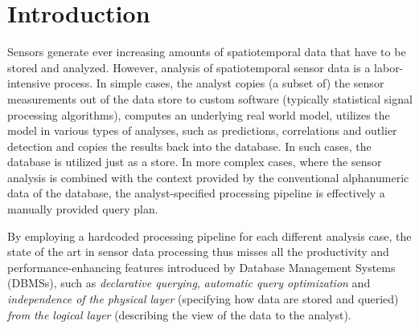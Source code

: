 \section{Introduction}
\label{sec:introduction}

Sensors generate ever increasing amounts of spatiotemporal data that have to be stored and analyzed. However, analysis of spatiotemporal sensor data is a labor-intensive process. In simple cases, the analyst copies (a subset of) the sensor measurements out of the data store to custom software (typically statistical signal processing algorithms),  computes an underlying real world model, utilizes the model in various types of analyses, such as predictions, correlations and outlier detection and copies the results back into the database. In such cases, the database is utilized just as a store. In more complex cases, where the sensor analysis is combined with the context provided by the conventional alphanumeric data of the database, the analyst-specified processing pipeline is effectively a manually provided query plan. 

 By employing a hardcoded processing pipeline for each different analysis case, the state of the art in sensor data processing thus misses all the productivity and performance-enhancing features introduced by Database Management Systems (DBMSs), such as {\em declarative querying}, {\em automatic query optimization} and {\em independence of the physical layer} (specifying how data are stored and queried) {\em from the logical layer} (describing the view of the data to the analyst).

